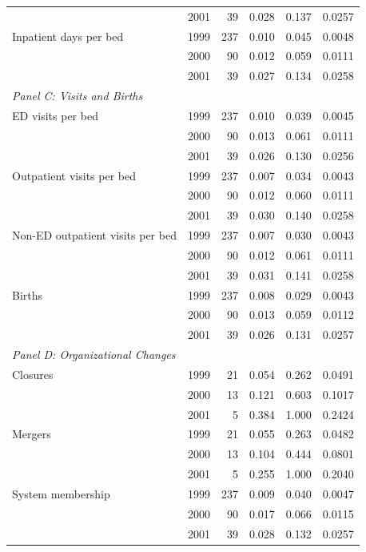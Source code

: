 \begin{tabular}{l c r r r r}
 & 2001 & 39 & 0.028 & 0.137 & 0.0257 \\
Inpatient days per bed & 1999 & 237 & 0.010 & 0.045 & 0.0048 \\
 & 2000 & 90 & 0.012 & 0.059 & 0.0111 \\
 & 2001 & 39 & 0.027 & 0.134 & 0.0258 \\
\midrule
\multicolumn{6}{l}{\textit{Panel C: Visits and Births}} \\
ED visits per bed & 1999 & 237 & 0.010 & 0.039 & 0.0045 \\
 & 2000 & 90 & 0.013 & 0.061 & 0.0111 \\
 & 2001 & 39 & 0.026 & 0.130 & 0.0256 \\
Outpatient visits per bed & 1999 & 237 & 0.007 & 0.034 & 0.0043 \\
 & 2000 & 90 & 0.012 & 0.060 & 0.0111 \\
 & 2001 & 39 & 0.030 & 0.140 & 0.0258 \\
Non-ED outpatient visits per bed & 1999 & 237 & 0.007 & 0.030 & 0.0043 \\
 & 2000 & 90 & 0.012 & 0.061 & 0.0111 \\
 & 2001 & 39 & 0.031 & 0.141 & 0.0258 \\
Births & 1999 & 237 & 0.008 & 0.029 & 0.0043 \\
 & 2000 & 90 & 0.013 & 0.059 & 0.0112 \\
 & 2001 & 39 & 0.026 & 0.131 & 0.0257 \\
\midrule
\multicolumn{6}{l}{\textit{Panel D: Organizational Changes}} \\
Closures & 1999 & 21 & 0.054 & 0.262 & 0.0491 \\
 & 2000 & 13 & 0.121 & 0.603 & 0.1017 \\
 & 2001 & 5 & 0.384 & 1.000 & 0.2424 \\
Mergers & 1999 & 21 & 0.055 & 0.263 & 0.0482 \\
 & 2000 & 13 & 0.104 & 0.444 & 0.0801 \\
 & 2001 & 5 & 0.255 & 1.000 & 0.2040 \\
System membership & 1999 & 237 & 0.009 & 0.040 & 0.0047 \\
 & 2000 & 90 & 0.017 & 0.066 & 0.0115 \\
 & 2001 & 39 & 0.028 & 0.132 & 0.0257 \\
\bottomrule
\end{tabular}
